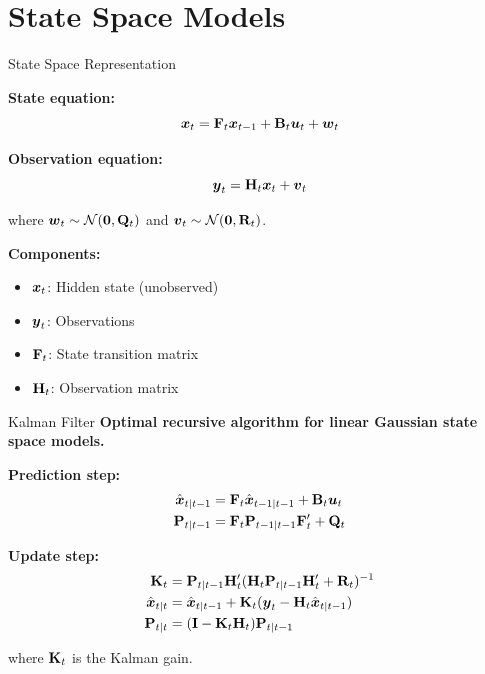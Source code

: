 \documentclass[aspectratio=169]{beamer}
\begin{document}
\section{State Space Models}

\begin{frame}{State Space Representation}
  \begin{definitionbox}[title={State Space Model}]
    \textbf{State equation:}
    \begin{equation}
      \boldsymbol{x}_t = \mathbf{F}_t \boldsymbol{x}_{t-1} + \mathbf{B}_t \boldsymbol{u}_t + \boldsymbol{w}_t
    \end{equation}

    \textbf{Observation equation:}
    \begin{equation}
      \boldsymbol{y}_t = \mathbf{H}_t \boldsymbol{x}_t + \boldsymbol{v}_t
    \end{equation}

    where $\boldsymbol{w}_t \sim \mathcal{N}(\boldsymbol{0}, \mathbf{Q}_t)$ and $\boldsymbol{v}_t \sim \mathcal{N}(\boldsymbol{0}, \mathbf{R}_t)$.
  \end{definitionbox}

  \vspace{0.5em}

  \textbf{Components:}
  \begin{itemize}
    \item $\boldsymbol{x}_t$: Hidden state (unobserved)
    \item $\boldsymbol{y}_t$: Observations
    \item $\mathbf{F}_t$: State transition matrix
    \item $\mathbf{H}_t$: Observation matrix
  \end{itemize}
\end{frame}

\begin{frame}{Kalman Filter}
  \textbf{Optimal recursive algorithm for linear Gaussian state space models.}

  \vspace{0.5em}

  \textbf{Prediction step:}
  \begin{align}
    \hat{\boldsymbol{x}}_{t|t-1} &= \mathbf{F}_t \hat{\boldsymbol{x}}_{t-1|t-1} + \mathbf{B}_t \boldsymbol{u}_t \\
    \mathbf{P}_{t|t-1} &= \mathbf{F}_t \mathbf{P}_{t-1|t-1} \mathbf{F}_t' + \mathbf{Q}_t
  \end{align}

  \textbf{Update step:}
  \begin{align}
    \mathbf{K}_t &= \mathbf{P}_{t|t-1} \mathbf{H}_t' (\mathbf{H}_t \mathbf{P}_{t|t-1} \mathbf{H}_t' + \mathbf{R}_t)^{-1} \\
    \hat{\boldsymbol{x}}_{t|t} &= \hat{\boldsymbol{x}}_{t|t-1} + \mathbf{K}_t (\boldsymbol{y}_t - \mathbf{H}_t \hat{\boldsymbol{x}}_{t|t-1}) \\
    \mathbf{P}_{t|t} &= (\mathbf{I} - \mathbf{K}_t \mathbf{H}_t) \mathbf{P}_{t|t-1}
  \end{align}

  where $\mathbf{K}_t$ is the Kalman gain.
\end{frame}
\end{document}

